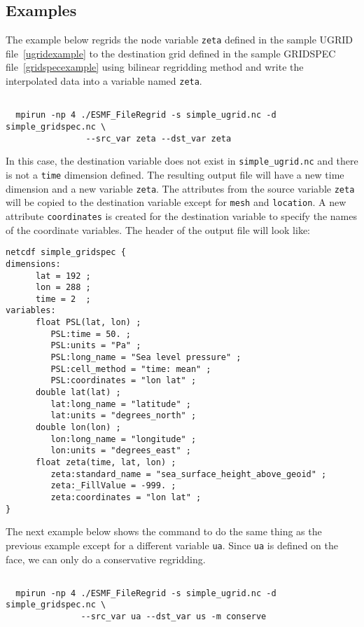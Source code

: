 \subsection{Examples}

The example below regrids the node variable {\tt zeta} defined in the sample UGRID file~\ref{ugridexample} to 
the destination grid defined in the sample GRIDSPEC file~\ref{gridspecexample} using bilinear regridding
method and write the interpolated data into a variable named {\tt zeta}.  

\begin{verbatim}

  mpirun -np 4 ./ESMF_FileRegrid -s simple_ugrid.nc -d simple_gridspec.nc \
                --src_var zeta --dst_var zeta

\end{verbatim}

In this case, the destination variable does not exist in {\tt simple\_ugrid.nc} and there is not a {\tt time}
dimension defined.  The resulting output file will have a new time dimension and a new variable {\tt zeta}.
The attributes from the source variable {\tt zeta} will be copied to the destination variable except for 
{\tt mesh} and {\tt location}.  A new attribute {\tt coordinates} is created for the destination variable to
specify the names of the coordinate variables.  The header of the output file will look like:

\begin{verbatim}
netcdf simple_gridspec {
dimensions:
      lat = 192 ;
      lon = 288 ;
      time = 2  ;
variables:
      float PSL(lat, lon) ;
         PSL:time = 50. ;
         PSL:units = "Pa" ;
         PSL:long_name = "Sea level pressure" ;
         PSL:cell_method = "time: mean" ;
         PSL:coordinates = "lon lat" ;
      double lat(lat) ;
         lat:long_name = "latitude" ;
         lat:units = "degrees_north" ;
      double lon(lon) ;
         lon:long_name = "longitude" ;
         lon:units = "degrees_east" ;
      float zeta(time, lat, lon) ;
         zeta:standard_name = "sea_surface_height_above_geoid" ;
         zeta:_FillValue = -999. ;
         zeta:coordinates = "lon lat" ;
}
\end{verbatim}
  
The next example below shows the command to do the same thing as the previous example except for a 
different variable {\tt ua}.  Since {\tt ua} is defined on the face, we can only do a conservative 
regridding.

\begin{verbatim}

  mpirun -np 4 ./ESMF_FileRegrid -s simple_ugrid.nc -d simple_gridspec.nc \
               --src_var ua --dst_var us -m conserve

\end{verbatim}


